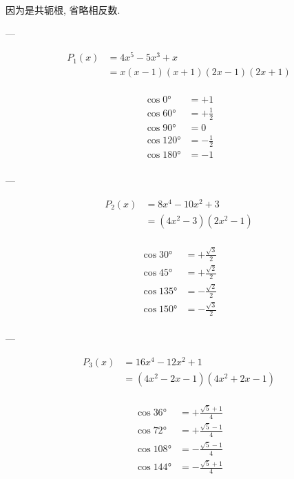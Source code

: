 \usepackage{amsmath}
\usepackage[utf8]{inputenc}
\usepackage[T1]{fontenc}


因为是共轭根, 省略相反数.

---

$$
\begin{aligned}
    P_{1}(x)
    &= 4 x^5-5 x^3+x\\
    &= x(x-1)(x+1)(2x-1)(2x+1)\\
\end{aligned}
$$

$$
\begin{aligned}
    \cos 0°   &= +1\\
    \cos 60°  &= +\frac{1}{2}\\
    \cos 90°  &= 0\\
    \cos 120° &= -\frac{1}{2}\\
    \cos 180° &= -1\\
\end{aligned}
$$

---

$$
\begin{aligned}
    P_{2}(x)
    &= 8 x^4-10 x^2+3\\
    &= \left(4 x^2-3\right) \left(2 x^2-1\right)\\
\end{aligned}
$$

$$
\begin{aligned}
    \cos 30°  &= +\frac{\sqrt{3}}{2}\\
    \cos 45°  &= +\frac{\sqrt{2}}{2}\\
    \cos 135° &= -\frac{\sqrt{2}}{2}\\
    \cos 150° &= -\frac{\sqrt{3}}{2}\\
\end{aligned}
$$

---

$$
\begin{aligned}
    P_{3}(x)
    &= 16 x^4-12 x^2+1\\
    &= \left(4 x^2-2 x-1\right) \left(4 x^2+2 x-1\right)\\
\end{aligned}
$$

$$
\begin{aligned}
    \cos 36°  &= +\frac{\sqrt{5}+1}{4}\\
    \cos 72°  &= +\frac{\sqrt{5}-1}{4}\\
    \cos 108° &= -\frac{\sqrt{5}-1}{4}\\
    \cos 144° &= -\frac{\sqrt{5}+1}{4}\\
\end{aligned}
$$

